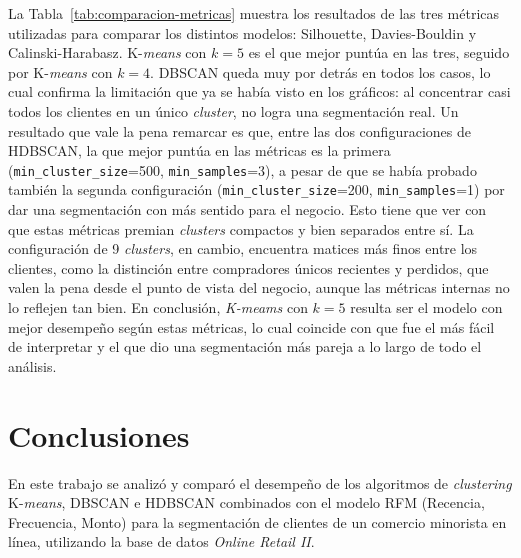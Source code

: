 \documentclass[a4paper,10pts,openany]{book}
\begin{document}
	La Tabla~\ref{tab:comparacion-metricas} muestra los resultados de las tres métricas utilizadas para comparar los distintos modelos: Silhouette,
	Davies-Bouldin y Calinski-Harabasz. K-\emph{means} con $k=5$ es el que mejor puntúa en las tres, seguido por K-\emph{means} con $k=4$. DBSCAN queda muy por detrás en todos los casos, lo cual confirma la limitación que ya se había visto en los gráficos: al concentrar casi todos los clientes en un único \emph{cluster}, no logra una segmentación real. Un resultado que vale la pena remarcar es que, entre las dos configuraciones de HDBSCAN, la que mejor puntúa en las métricas es la primera (\texttt{min\_cluster\_size}=500, \texttt{min\_samples}=3), a pesar de que se había probado también la segunda configuración (\texttt{min\_cluster\_size}=200, \texttt{min\_samples}=1) por dar una segmentación con más sentido para el negocio. Esto tiene que ver con que estas métricas premian \emph{clusters} compactos y bien separados entre sí. La configuración de 9 \emph{clusters}, en cambio, encuentra matices más finos entre los clientes, como la distinción entre compradores únicos recientes y perdidos, que valen la pena desde el punto de vista del negocio, aunque las métricas internas no lo reflejen tan bien. En conclusión, \emph{K-meams} con $k=5$ resulta ser el modelo con mejor desempeño según estas métricas, lo cual coincide con que fue el más fácil de interpretar y el que dio una segmentación más pareja a lo largo de todo el análisis.
	
	\chapter{Conclusiones}
	
	En este trabajo se analizó y comparó el desempeño de los algoritmos de \emph{clustering} K-\emph{means}, DBSCAN e HDBSCAN combinados con el modelo RFM (Recencia, Frecuencia, Monto) para la segmentación de clientes de un comercio minorista en línea, utilizando la base de datos \emph{Online Retail II}.
	
\end{document}
